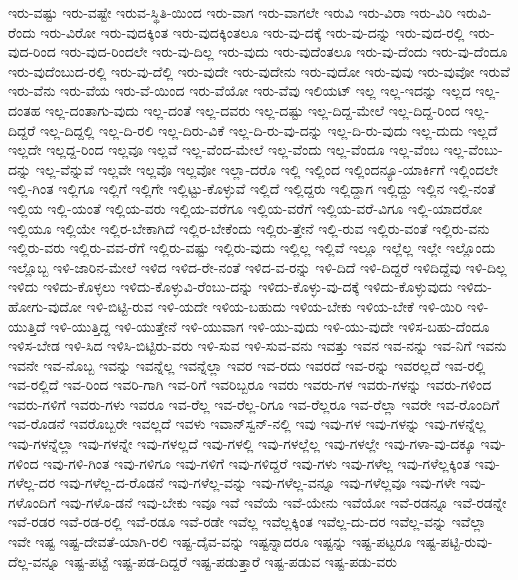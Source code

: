 {ಇರು-ವಷ್ಟು
ಇರು-ವಷ್ಟೇ
ಇರುವ-ಸ್ಥಿತಿ-ಯಿಂದ
ಇರು-ವಾಗ
ಇರು-ವಾಗಲೇ
ಇರುವಿ
ಇರು-ವಿರಾ
ಇರು-ವಿರಿ
ಇರುವಿ-ರೆಂದು
ಇರು-ವಿರೋ
ಇರು-ವುದಕ್ಕಿಂತ
ಇರು-ವುದಕ್ಕಿಂತಲೂ
ಇರು-ವು-ದಕ್ಕೆ
ಇರು-ವು-ದನ್ನು
ಇರು-ವುದ-ರಲ್ಲಿ
ಇರು-ವುದ-ರಿಂದ
ಇರು-ವುದ-ರಿಂದಲೇ
ಇರು-ವು-ದಿಲ್ಲ
ಇರು-ವುದು
ಇರು-ವುದೆಂತಲೂ
ಇರು-ವು-ದೆಂದು
ಇರು-ವು-ದೆಂದೂ
ಇರು-ವುದೆಂಬುದ-ರಲ್ಲಿ
ಇರು-ವು-ದೆಲ್ಲಿ
ಇರು-ವುದೇ
ಇರು-ವುದೇನು
ಇರು-ವುದೋ
ಇರು-ವುವು
ಇರು-ವುವೋ
ಇರುವೆ
ಇರು-ವೆನು
ಇರು-ವೆಯ
ಇರು-ವೆ-ಯಿಂದ
ಇರು-ವೆಯೋ
ಇರು-ವೆವು
ಇಲಿಯಟ್
ಇಲ್ಲ
ಇಲ್ಲ-ಇದನ್ನು
ಇಲ್ಲದ
ಇಲ್ಲ-ದಂತಹ
ಇಲ್ಲ-ದಂತಾಗು-ವುದು
ಇಲ್ಲ-ದಂತೆ
ಇಲ್ಲ-ದವರು
ಇಲ್ಲ-ದಷ್ಟು
ಇಲ್ಲ-ದಿದ್ದ-ಮೇಲೆ
ಇಲ್ಲ-ದಿದ್ದ-ರಿಂದ
ಇಲ್ಲ-ದಿದ್ದರೆ
ಇಲ್ಲ-ದಿದ್ದಲ್ಲಿ
ಇಲ್ಲ-ದಿ-ರಲಿ
ಇಲ್ಲ-ದಿರು-ವಿಕೆ
ಇಲ್ಲ-ದಿ-ರು-ವು-ದನ್ನು
ಇಲ್ಲ-ದಿ-ರು-ವುದು
ಇಲ್ಲ-ದುದು
ಇಲ್ಲದೆ
ಇಲ್ಲದೇ
ಇಲ್ಲದ್ದ-ರಿಂದ
ಇಲ್ಲವೂ
ಇಲ್ಲವೆ
ಇಲ್ಲ-ವೆಂದ-ಮೇಲೆ
ಇಲ್ಲ-ವೆಂದು
ಇಲ್ಲ-ವೆಂದೂ
ಇಲ್ಲ-ವೆಂಬ
ಇಲ್ಲ-ವೆಂಬು-ದನ್ನು
ಇಲ್ಲ-ವೆನ್ನುವೆ
ಇಲ್ಲವೇ
ಇಲ್ಲವೊ
ಇಲ್ಲವೋ
ಇಲ್ಲಾ-ದರೊ
ಇಲ್ಲಿ
ಇಲ್ಲಿಂದ
ಇಲ್ಲಿಂದನ್ಯೂ-ಯಾರ್ಕಿಗೆ
ಇಲ್ಲಿಂದಲೇ
ಇಲ್ಲಿ-ಗಿಂತ
ಇಲ್ಲಿಗೂ
ಇಲ್ಲಿಗೆ
ಇಲ್ಲಿಗೇ
ಇಲ್ಲಿಟ್ಟು-ಕೊಳ್ಳುವೆ
ಇಲ್ಲಿದೆ
ಇಲ್ಲಿದ್ದರು
ಇಲ್ಲಿದ್ದಾಗ
ಇಲ್ಲಿದ್ದು
ಇಲ್ಲಿನ
ಇಲ್ಲಿ-ನಂತೆ
ಇಲ್ಲಿಯ
ಇಲ್ಲಿ-ಯಂತೆ
ಇಲ್ಲಿಯ-ವರು
ಇಲ್ಲಿಯ-ವರೆಗೂ
ಇಲ್ಲಿಯ-ವರೆಗೆ
ಇಲ್ಲಿಯ-ವರೆ-ವಿಗೂ
ಇಲ್ಲಿ-ಯಾದರೋ
ಇಲ್ಲಿಯೂ
ಇಲ್ಲಿಯೇ
ಇಲ್ಲಿರ-ಬೇಕಾಗಿದೆ
ಇಲ್ಲಿರ-ಬೇಕೆಂದು
ಇಲ್ಲಿರು-ತ್ತೇನೆ
ಇಲ್ಲಿ-ರುವ
ಇಲ್ಲಿರು-ವಂತೆ
ಇಲ್ಲಿರು-ವನು
ಇಲ್ಲಿರು-ವರು
ಇಲ್ಲಿರು-ವವ-ರೆಗೆ
ಇಲ್ಲಿರು-ವಷ್ಟು
ಇಲ್ಲಿರು-ವುದು
ಇಲ್ಲಿಲ್ಲ
ಇಲ್ಲಿವೆ
ಇಲ್ಲೂ
ಇಲ್ಲೆಲ್ಲ
ಇಲ್ಲೇ
ಇಲ್ಲೊಂದು
ಇಲ್ಲೊಬ್ಬ
ಇಳಿ-ಜಾರಿನ-ಮೇಲೆ
ಇಳಿದ
ಇಳಿದ-ರೇ-ನಂತೆ
ಇಳಿದ-ವ-ರನ್ನು
ಇಳಿ-ದಿದೆ
ಇಳಿ-ದಿದ್ದರೆ
ಇಳಿದಿದ್ದೆವು
ಇಳಿ-ದಿಲ್ಲ
ಇಳಿದು
ಇಳಿದು-ಕೊಳ್ಳಲು
ಇಳಿದು-ಕೊಳ್ಳುವಿ-ರೆಂಬು-ದನ್ನು
ಇಳಿದು-ಕೊಳ್ಳು-ವು-ದಕ್ಕೆ
ಇಳಿದು-ಕೊಳ್ಳುವುದು
ಇಳಿದು-ಹೋಗು-ವುದೋ
ಇಳಿ-ಬಿಟ್ಟಿ-ರುವ
ಇಳಿ-ಯದೇ
ಇಳಿಯ-ಬಹುದು
ಇಳಿಯ-ಬೇಕು
ಇಳಿಯ-ಬೇಕೆ
ಇಳಿ-ಯಿರಿ
ಇಳಿ-ಯುತ್ತಿದೆ
ಇಳಿ-ಯುತ್ತಿದ್ದ
ಇಳಿ-ಯುತ್ತೇನೆ
ಇಳಿ-ಯುವಾಗ
ಇಳಿ-ಯು-ವುದು
ಇಳಿ-ಯು-ವುದೇ
ಇಳಿಸ-ಬಹು-ದೆಂದೂ
ಇಳಿಸ-ಬೇಡ
ಇಳಿ-ಸಿದ
ಇಳಿಸಿ-ಬಿಟ್ಟಿರು-ವರು
ಇಳಿ-ಸುವ
ಇಳಿ-ಸುವ-ವನು
ಇವತ್ತು
ಇವನ
ಇವ-ನನ್ನು
ಇವ-ನಿಗೆ
ಇವನು
ಇವನೇ
ಇವ-ನೊಬ್ಬ
ಇವನ್ನು
ಇವನ್ನೆಲ್ಲ
ಇವನ್ನೆಲ್ಲಾ
ಇವರ
ಇವ-ರದು
ಇವರದೆ
ಇವ-ರನ್ನು
ಇವರಲ್ಲದೆ
ಇವ-ರಲ್ಲಿ
ಇವ-ರಲ್ಲಿದೆ
ಇವ-ರಿಂದ
ಇವರಿ-ಗಾಗಿ
ಇವ-ರಿಗೆ
ಇವರಿಬ್ಬರೂ
ಇವರು
ಇವರು-ಗಳ
ಇವರು-ಗಳನ್ನು
ಇವರು-ಗಳಿಂದ
ಇವರು-ಗಳಿಗೆ
ಇವರು-ಗಳು
ಇವರೂ
ಇವ-ರೆಲ್ಲ
ಇವ-ರೆಲ್ಲ-ರಿಗೂ
ಇವ-ರೆಲ್ಲರೂ
ಇವ-ರೆಲ್ಲಾ
ಇವರೇ
ಇವ-ರೊಂದಿಗೆ
ಇವ-ರೊಡನೆ
ಇವರೊಬ್ಬರೇ
ಇವಲ್ಲದೆ
ಇವಳು
ಇವಾನ್‌ಸ್ವನ್‌-ನಲ್ಲಿ
ಇವು
ಇವು-ಗಳ
ಇವು-ಗಳನ್ನು
ಇವು-ಗಳನ್ನೆಲ್ಲ
ಇವು-ಗಳನ್ನೆಲ್ಲಾ
ಇವು-ಗಳನ್ನೇ
ಇವು-ಗಳಲ್ಲದೆ
ಇವು-ಗಳಲ್ಲಿ
ಇವು-ಗಳಲ್ಲೆಲ್ಲ
ಇವು-ಗಳಲ್ಲೇ
ಇವು-ಗಳಾ-ವು-ದಕ್ಕೂ
ಇವು-ಗಳಿಂದ
ಇವು-ಗಳಿ-ಗಿಂತ
ಇವು-ಗಳಿಗೂ
ಇವು-ಗಳಿಗೆ
ಇವು-ಗಳಿದ್ದರೆ
ಇವು-ಗಳು
ಇವು-ಗಳೆಲ್ಲ
ಇವು-ಗಳೆಲ್ಲಕ್ಕಿಂತ
ಇವು-ಗಳೆಲ್ಲ-ದರ
ಇವು-ಗಳೆಲ್ಲ-ದ-ರೊಡನೆ
ಇವು-ಗಳೆಲ್ಲ-ವನ್ನು
ಇವು-ಗಳೆಲ್ಲ-ವನ್ನೂ
ಇವು-ಗಳೆಲ್ಲವೂ
ಇವು-ಗಳೇ
ಇವು-ಗಳೊಂದಿಗೆ
ಇವು-ಗಳೊ-ಡನೆ
ಇವು-ಬೇಕು
ಇವೂ
ಇವೆ
ಇವೆಯೆ
ಇವೆ-ಯೇನು
ಇವೆಯೋ
ಇವೆ-ರಡನ್ನೂ
ಇವೆ-ರಡನ್ನೇ
ಇವೆ-ರಡರ
ಇವೆ-ರಡ-ರಲ್ಲಿ
ಇವೆ-ರಡೂ
ಇವೆ-ರಡೇ
ಇವೆಲ್ಲ
ಇವೆಲ್ಲಕ್ಕಿಂತ
ಇವೆಲ್ಲ-ದು-ದರ
ಇವೆಲ್ಲ-ವನ್ನು
ಇವೆಲ್ಲಾ
ಇವೇ
ಇಷ್ಟ
ಇಷ್ಟ-ದೇವತೆ-ಯಾಗಿ-ರಲಿ
ಇಷ್ಟ-ದೈವ-ವನ್ನು
ಇಷ್ಟನ್ನಾದರೂ
ಇಷ್ಟನ್ನು
ಇಷ್ಟ-ಪಟ್ಟರೂ
ಇಷ್ಟ-ಪಟ್ಟಿ-ರುವು-ದೆಲ್ಲ-ವನ್ನೂ
ಇಷ್ಟ-ಪಟ್ಟೆ
ಇಷ್ಟ-ಪಡ-ದಿದ್ದರೆ
ಇಷ್ಟ-ಪಡುತ್ತಾರೆ
ಇಷ್ಟ-ಪಡುವ
ಇಷ್ಟ-ಪಡು-ವರು
}

